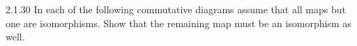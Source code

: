 \documentclass{article}
\begin{document}
\begin{exercise}{2.1.30}{\parindent}
  In each of the following commutative diagrams assume that all maps
  but one are isomorphisms. Show that the remaining map must be an
  isomorphism as well.
  \begin{center}
  \end{center}
\end{exercise}
\end{document}
